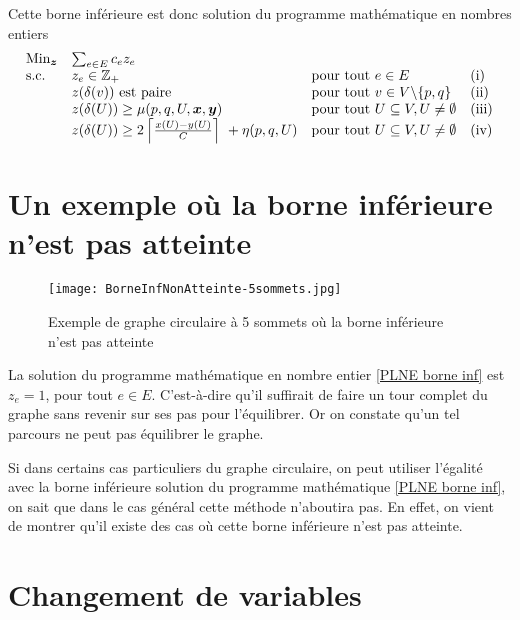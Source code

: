 Cette borne inférieure est donc solution du programme mathématique en nombres entiers
\begin{gather}\label{PLNE borne inf}
\begin{array}{llll}
  \mbox{Min}_{\boldsymbol{z}} &\sum_{e \in E} c_ez_e & & \\
  \mbox{s.c.}       &z_e \in \mathbb{Z}_+ &\mbox{pour tout } e \in E &\mbox{(i)} \\
                    &z(\delta(v)) \mbox{ est paire} &\mbox{pour tout } v \in V \backslash \{p,q\}&\mbox{(ii)} \\
                    &z(\delta(U)) \ge \mu(p,q,U,\boldsymbol{x},\boldsymbol{y}) &\mbox{pour tout } U \subseteq V, U \ne \emptyset &\mbox{(iii)} \\
                    &z(\delta(U)) \ge 2 \left\lceil \frac{x(U)-y(U)}{C} \right\rceil\ + \eta(p,q,U) &\mbox{pour tout } U \subseteq V, U \ne \emptyset &\mbox{(iv)}
\end{array}
\end{gather}

\section{Un exemple où la borne inférieure n'est pas atteinte}

\begin{figure}[ht]
  \label{Exemple de borne inf non atteinte}
  \center \texttt{[image: BorneInfNonAtteinte-5sommets.jpg]}
  \caption{Exemple de graphe circulaire à 5 sommets où la borne inférieure n'est pas atteinte}
\end{figure}

La solution du programme mathématique en nombre entier \eqref{PLNE borne inf} est $z_e = 1$, pour tout $e \in E$. C'est-à-dire qu'il suffirait de faire un tour complet du graphe sans revenir sur ses pas pour l'équilibrer. Or on constate qu'un tel parcours ne peut pas équilibrer le graphe.

Si dans certains cas particuliers du graphe circulaire, on peut utiliser l'égalité avec la borne inférieure solution du programme mathématique \eqref{PLNE borne inf}, on sait que dans le cas général cette méthode n'aboutira pas. En effet, on vient de montrer qu'il existe des cas où cette borne inférieure n'est pas atteinte.

\section{Changement de variables}
\label{Changement variables}

